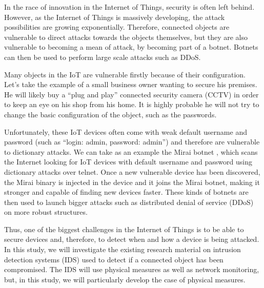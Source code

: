 
In the race of innovation in the Internet of Things, security is often left behind. However, as the Internet of Things is massively developing, the attack possibilities are growing exponentially. Therefore, connected objects are vulnerable to direct attacks towards the objects themselves, but they are also vulnerable to becoming a mean of attack, by becoming part of a botnet. Botnets can then be used to perform large scale attacks such as DDoS.
\smallskip

Many objects in the IoT are vulnerable firstly because of their configuration. Let’s take the example of a small business owner wanting to secure his premises. He will likely buy a “plug and play” connected security camera (CCTV) in order to keep an eye on his shop from his home. It is highly probable he will not try to change the basic configuration of the object, such as the passwords.
\smallskip

Unfortunately, these IoT devices often come with weak default username and password (such as “login: admin, password: admin”) and therefore are vulnerable to dictionary attacks. We can take as an example the Mirai botnet \cite{mirai_botnet}, which scans the Internet looking for IoT devices with default username and password using dictionary attacks over telnet. Once a new vulnerable device has been discovered, the Mirai binary is injected in the device and it joins the Mirai botnet, making it stronger and capable of finding new devices faster. These kinds of botnets are then used to launch bigger attacks such as distributed denial of service (DDoS) on more robust structures.
\smallskip

Thus, one of the biggest challenges in the Internet of Things is to be able to secure devices and, therefore,  to detect when and how a device is being attacked. In this study, we will investigate the existing research material on intrusion detection systems (IDS) used to detect if a connected object has been compromised. The IDS will use physical measures as well as network monitoring, but, in this study, we will particularly develop the case of  physical measures.








